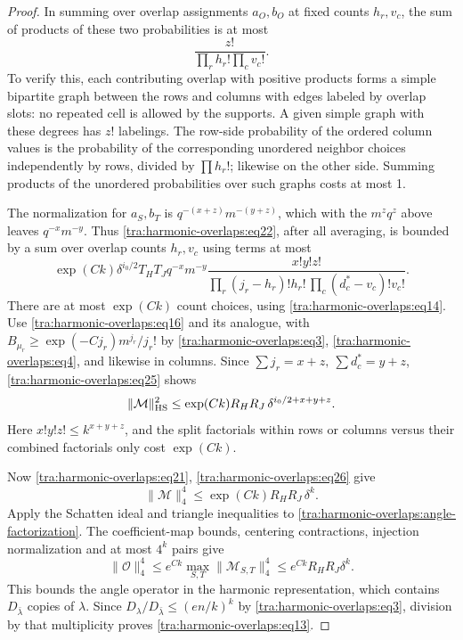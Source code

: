 \begin{proof}
In summing over overlap assignments \(a_O,b_O\) at fixed counts \(h_r,v_c\), the sum of products of these two probabilities is at most
\begin{equation}
                             \frac{z!}{\prod_r h_r!\prod_c v_c!}.           \label{tra:harmonic-overlaps:eq24}
\end{equation}
To verify this, each contributing overlap with positive products forms a simple bipartite graph between the rows and columns with edges labeled by overlap slots: no repeated cell is allowed by the supports. A given simple graph with these degrees has \(z!\) labelings. The row-side probability of the ordered column values is the probability of the corresponding unordered neighbor choices independently by rows, divided by \(\prod h_r!\); likewise on the other side. Summing products of the unordered probabilities over such graphs costs at most 1.

\label{tra:harmonic-overlaps:hilbert-schmidt-and-fourth-norm}
The normalization for \(a_S,b_T\) is \(q^{-(x+z)}m^{-(y+z)}\), which with the \(m^z q^z\) above leaves \(q^{-x}m^{-y}\). Thus \eqref{tra:harmonic-overlaps:eq22}, after all averaging, is bounded by a sum over overlap counts \(h_r,v_c\) using terms at most
\begin{equation}
 \exp(Ck)\delta^{i_0/2} T_H T_J
       q^{-x}m^{-y}
       \frac{x!y! z!}
        {\prod_r (j_r-h_r)! h_r!\,\prod_c(d_c^*-v_c)! v_c!}.             \label{tra:harmonic-overlaps:eq25}
\end{equation}
There are at most \(\exp(Ck)\) count choices, using \eqref{tra:harmonic-overlaps:eq14}. Use \eqref{tra:harmonic-overlaps:eq16} and its analogue, with
\( B_{\mu_r}\ge \exp(-Cj_r)m^{j_r}/j_r!\)
by \eqref{tra:harmonic-overlaps:eq3}, \eqref{tra:harmonic-overlaps:eq4}, and likewise in columns. Since \(\sum j_r=x+z,\ \sum d_c^*=y+z\), \eqref{tra:harmonic-overlaps:eq25} shows
\begin{equation}
                 \|\mathcal M\|_{\rm HS}^2
                     \le \exp(Ck) R_H R_J\,\delta^{i_0/2+x+y+z}.         \label{tra:harmonic-overlaps:eq26}
\end{equation}
Here \(x! y! z!\le k^{x+y+z}\), and the split factorials within rows or columns versus their combined factorials only cost \(\exp(Ck)\).

Now \eqref{tra:harmonic-overlaps:eq21}, \eqref{tra:harmonic-overlaps:eq26} give
\[
                   \|\mathcal M\|_4^4\le
                         \exp(Ck) R_H R_J\,\delta^k.
\]
Apply the Schatten ideal and triangle inequalities to \eqref{tra:harmonic-overlaps:angle-factorization}. The coefficient-map bounds, centering contractions, injection normalization and at most \(4^k\) pairs give
\[
 \|\mathcal O\|_4^4
 \le e^{Ck}\max_{S,T}\|\mathcal M_{S,T}\|_4^4
 \le e^{Ck}R_HR_J\delta^k.
\]
This bounds the angle operator in the harmonic representation, which contains \(D_{\bar\lambda}\) copies of \(\lambda\). Since \(D_\lambda/D_{\bar\lambda}\le(en/k)^k\) by \eqref{tra:harmonic-overlaps:eq3}, division by that multiplicity proves \eqref{tra:harmonic-overlaps:eq13}.

\end{proof}

